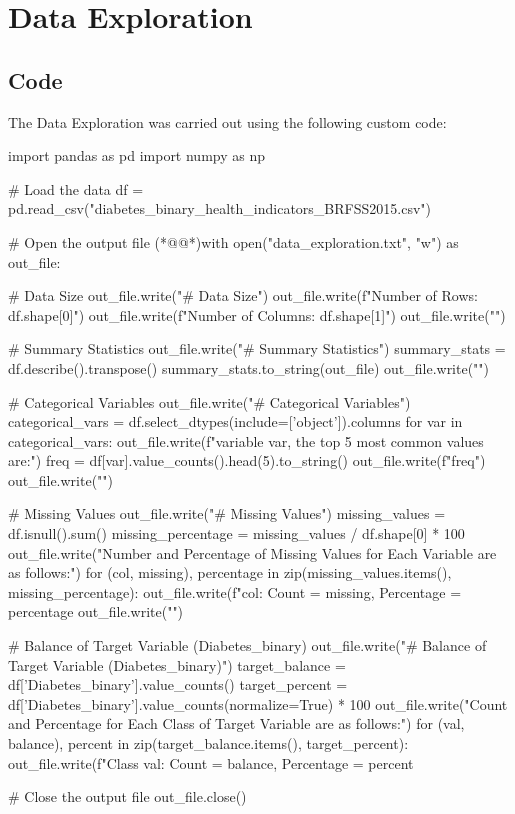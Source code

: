 \documentclass[11pt]{article}
\begin{document}
\section{Data Exploration}
\subsection{{Code}}
The Data Exploration was carried out using the following custom code:

\begin{python}

import pandas as pd
import numpy as np

# Load the data
df = pd.read_csv("diabetes_binary_health_indicators_BRFSS2015.csv")

# Open the output file
(*@@*)with open("data_exploration.txt", "w") as out_file:
    
    # Data Size
    out_file.write("# Data Size\n")
    out_file.write(f"Number of Rows: {df.shape[0]}\n")
    out_file.write(f"Number of Columns: {df.shape[1]}\n")
    out_file.write("\n")
    
    # Summary Statistics
    out_file.write("# Summary Statistics\n")
    summary_stats = df.describe().transpose()
    summary_stats.to_string(out_file)
    out_file.write("\n")
    
    # Categorical Variables
    out_file.write("# Categorical Variables\n")
    categorical_vars = df.select_dtypes(include=['object']).columns
    for var in categorical_vars:
        out_file.write(f"\nFor variable {var}, the top 5 most common values are:\n")
        freq = df[var].value_counts().head(5).to_string()
        out_file.write(f"{freq}\n")
    out_file.write("\n")
    
    # Missing Values
    out_file.write("# Missing Values\n")
    missing_values = df.isnull().sum()
    missing_percentage = missing_values / df.shape[0] * 100
    out_file.write("Number and Percentage of Missing Values for Each Variable are as follows:\n")
    for (col, missing), percentage in zip(missing_values.items(), missing_percentage):
        out_file.write(f"{col}: Count = {missing}, Percentage = {percentage}%
    out_file.write("\n")
    
    # Balance of Target Variable (Diabetes_binary)
    out_file.write("# Balance of Target Variable (Diabetes_binary)\n")
    target_balance = df['Diabetes_binary'].value_counts()
    target_percent = df['Diabetes_binary'].value_counts(normalize=True) * 100
    out_file.write("Count and Percentage for Each Class of Target Variable are as follows:\n")
    for (val, balance), percent in zip(target_balance.items(), target_percent):
        out_file.write(f"Class {val}: Count = {balance}, Percentage = {percent}%

# Close the output file
out_file.close()

\end{python}
\end{document}
